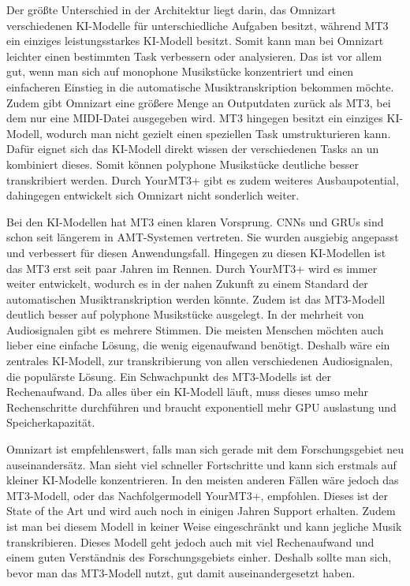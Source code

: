 Der größte Unterschied in der Architektur liegt darin,
das Omnizart verschiedenen KI-Modelle für unterschiedliche Aufgaben besitzt,
während MT3 ein einziges leistungsstarkes KI-Modell besitzt.
Somit kann man bei Omnizart leichter einen bestimmten Task verbessern oder analysieren.
Das ist vor allem gut, wenn man sich auf monophone Musikstücke konzentriert
und einen einfacheren Einstieg in die automatische Musiktranskription bekommen möchte.
Zudem gibt Omnizart eine größere Menge an Outputdaten zurück als MT3, bei dem nur eine MIDI-Datei ausgegeben wird.
MT3 hingegen besitzt ein einziges KI-Modell, wodurch man nicht gezielt einen speziellen Task umstrukturieren kann.
Dafür eignet sich das KI-Modell direkt wissen der verschiedenen Tasks an un kombiniert dieses.
Somit können polyphone Musikstücke deutliche besser transkribiert werden.
Durch YourMT3+ gibt es zudem weiteres Ausbaupotential, dahingegen entwickelt sich Omnizart nicht sonderlich weiter.

Bei den KI-Modellen hat MT3 einen klaren Vorsprung.
CNNs und GRUs sind schon seit längerem in AMT-Systemen vertreten.
Sie wurden ausgiebig angepasst und verbessert für diesen Anwendungsfall.
Hingegen zu diesen KI-Modellen ist das MT3 erst seit paar Jahren im Rennen.
Durch YourMT3+ wird es immer weiter entwickelt,
wodurch es in der nahen Zukunft zu einem Standard der automatischen Musiktranskription werden könnte.
Zudem ist das MT3-Modell deutlich besser auf polyphone Musikstücke ausgelegt.
In der mehrheit von Audiosignalen gibt es mehrere Stimmen.
Die meisten Menschen möchten auch lieber eine einfache Lösung, die wenig eigenaufwand benötigt.
Deshalb wäre ein zentrales KI-Modell, zur transkribierung von allen verschiedenen Audiosignalen, die populärste Lösung.
Ein Schwachpunkt des MT3-Modells ist der Rechenaufwand.
Da alles über ein KI-Modell läuft,
muss dieses umso mehr Rechenschritte durchführen und braucht exponentiell mehr GPU auslastung und Speicherkapazität.

Omnizart ist empfehlenswert, falls man sich gerade mit dem Forschungsgebiet neu auseinandersätz.
Man sieht viel schneller Fortschritte und kann sich erstmals auf kleiner KI-Modelle konzentrieren.
In den meisten anderen Fällen wäre jedoch das MT3-Modell, oder das Nachfolgermodell YourMT3+, empfohlen.
Dieses ist der State of the Art und wird auch noch in einigen Jahren Support erhalten.
Zudem ist man bei diesem Modell in keiner Weise eingeschränkt und kann jegliche Musik transkribieren.
Dieses Modell geht jedoch auch mit viel Rechenaufwand und einem guten Verständnis des Forschungsgebiets einher.
Deshalb sollte man sich, bevor man das MT3-Modell nutzt, gut damit auseinandergesetzt haben.